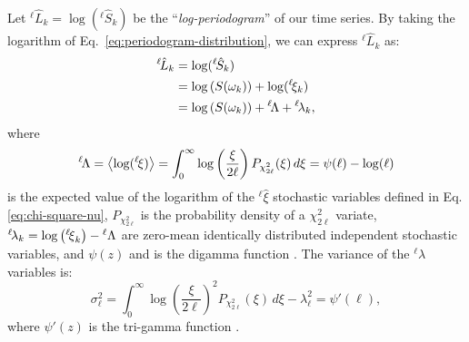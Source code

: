 Let $^{{\ell\!}}\hat{L}_{k} = \log(^{\ell\!}\hat{S}_{k})$ be the ``\emph{log-periodogram}'' of our time series. By taking the logarithm of Eq.~\eqref{eq:periodogram-distribution}, we can express $^{\ell\!}\hat{L}_{k}$ as:
\begin{align}
    ^{{\ell\!}}\hat{L}_{k} &= \log (^{\ell\!}\hat{S}_{k} ) \nonumber\\
    &= \log\left(S(\omega_k) \right) + \log( ^{\ell\!}{\xi}_k) \nonumber\\
    &= \log\left(S(\omega_k) \right) + {^{\ell\!}\rLambda} + {^{\ell\!}{\lambda}}_{k},  \label{eq:log-PSD}
\end{align}
where
\begin{equation}
    {^{\ell\!}\rLambda} = \left\langle \log( {^{\ell\!}{\xi}}) \right\rangle = \int_0^\infty \log\left (\frac{\xi}{2\ell}\right ) P_{\chi^2_{2\ell}}(\xi) \, d\xi = \psi(\ell)-\log(\ell) \label{eq:lambda-ell}
\end{equation}
is the expected value of the logarithm of the ${^\ell}\hat\xi$ stochastic variables defined in Eq. \eqref{eq:chi-square-nu}, $P_{\chi^2_{2\ell}}$ is the probability density of a $\chi^2_{2\ell}$ variate, $^{\ell\!}{\lambda}_k = \log\left( {^{\ell\!}{\xi}}_k\right) - {^\ell{{\mathrm\Lambda}}}$ are zero-mean identically distributed independent stochastic variables, and $\psi(z)$ and is the digamma function \cite{PolyGamma}. 
The variance of the $^{\ell\!}\lambda$ variables is:
\begin{equation}
    \sigma_{\ell}^{2} = \int_0^\infty \log\left (\frac{\xi}{2\ell}\right )^2 P_{\chi^2_{2\ell}}(\xi) \, d\xi - \lambda_{\ell}^2 =\psi'(\ell),\label{eq:sigma2-ell}
\end{equation}
where $\psi'(z)$ is the tri-gamma function \cite{PolyGamma}. 


